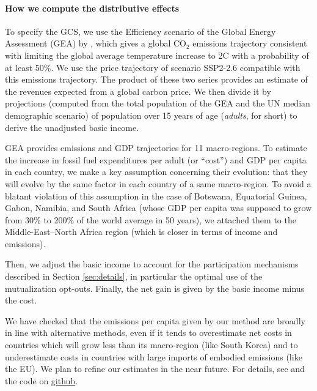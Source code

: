 \documentclass[12pt,english]{article}
\begin{document}
\begin{tcolorbox}
  {\small
  \paragraph{How we compute the distributive effects}
  To specify the GCS, we use the Efficiency scenario of the Global Energy Assessment (GEA) by \citet{johansson_global_2012}, which gives a global CO$_\text{2}$ emissions trajectory consistent with limiting the global average temperature increase to 2\textdegree{}C with a probability of at least 50\%. We use the price trajectory of scenario SSP2-2.6 \citep{fricko_marker_2017} compatible with this emissions trajectory. 
  The product of these two series provides an estimate of the revenues expected from a global carbon price. We then divide it by projections (computed from the total population of the GEA and the UN median demographic scenario) of population over 15 years of age (\textit{adults}, for short) to derive the unadjusted basic income.  

  GEA provides emissions and GDP trajectories for 11 macro-regions. To estimate the increase in fossil fuel expenditures per adult (or ``cost'') and GDP per capita in each country, we make a key assumption concerning their evolution: that they will evolve by the same factor in each country of a same macro-region. To avoid a blatant violation of this assumption in the case of Botswana, Equatorial Guinea, Gabon, Namibia, and South Africa (whose GDP per capita was supposed to grow from 30\% to 200\% of the world average in 50 years), we attached them to the Middle-East--North Africa region (which is closer in terms of income and emissions). 
  
  Then, we adjust the basic income to account for the participation mechanisms described in Section \ref{sec:details}, in particular the optimal use of the mutualization opt-outs. Finally, the net gain is given by the basic income minus the cost. 

  We have checked that the emissions per capita given by our method are broadly in line with alternative methods, even if it tends to overestimate net costs in countries which will grow less than its macro-region (like South Korea) and to underestimate costs in countries with large imports of embodied emissions (like the EU). We plan to refine our estimates in the near future. 
  For details, see \citet{fabre_international_2023} and the code on \href{https://github.com/bixiou/global_tax_attitudes/blob/main/code_global/map_GCS_incidence.R}{github}. 

}
\end{tcolorbox}
\end{document}
